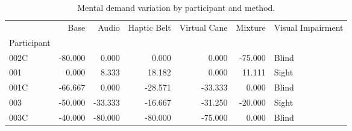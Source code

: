 
\begin{table}[!htb]
\centering
\caption{Mental demand variation by participant and method.}
\label{tab:md_variation}
\begin{tabular}{lrrrrrl}
\toprule
{} &    Base &   Audio &  Haptic Belt &  Virtual Cane &  Mixture & Visual Impairment \\
Participant &         &         &              &               &          &                   \\
\midrule
002C        & -80.000 &   0.000 &        0.000 &         0.000 &  -75.000 &             Blind \\
001         &   0.000 &   8.333 &       18.182 &         0.000 &   11.111 &             Sight \\
001C        & -66.667 &   0.000 &      -28.571 &       -33.333 &    0.000 &             Blind \\
003         & -50.000 & -33.333 &      -16.667 &       -31.250 &  -20.000 &             Sight \\
003C        & -40.000 & -80.000 &      -80.000 &       -75.000 &    0.000 &             Blind \\
\bottomrule
\end{tabular}
\end{table}

